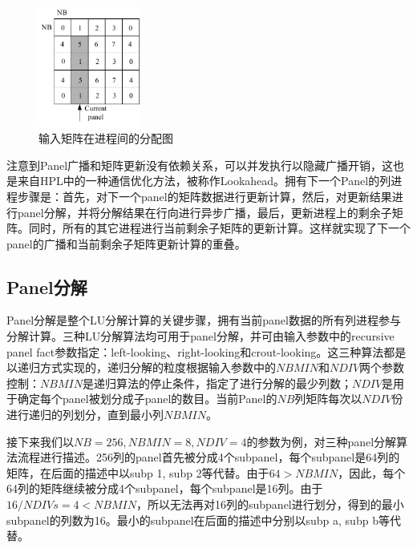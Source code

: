     \begin{figure}
        \centering
        \includegraphics[width=0.3\textwidth]{image/chap02/LUP}
        \caption{输入矩阵在进程间的分配图}
        \label{输入矩阵在进程间的分配图}
    \end{figure}

    注意到Panel广播和矩阵更新没有依赖关系，可以并发执行以隐藏广播开销，这也是来自HPL中的一种通信优化方法，被称作Lookahead。拥有下一个Panel的列进程步骤是：首先，对下一个panel的矩阵数据进行更新计算，然后，对更新结果进行panel分解，并将分解结果在行向进行异步广播，最后，更新进程上的剩余子矩阵。同时，所有的其它进程进行当前剩余子矩阵的更新计算。这样就实现了下一个panel的广播和当前剩余子矩阵更新计算的重叠。

    \subsection{Panel分解}

    Panel分解是整个LU分解计算的关键步骤\cite{2013Correcting}，拥有当前panel数据的所有列进程参与分解计算。三种LU分解算法均可用于panel分解，并可由输入参数中的recursive panel fact参数指定：left-looking、right-looking和crout-looking。这三种算法都是以递归方式实现的，递归分解的粒度根据输入参数中的$\mathit{NBMIN}$和$\mathit{NDIV}$两个参数控制：$\mathit{NBMIN}$是递归算法的停止条件，指定了进行分解的最少列数；$\mathit{NDIV}$是用于确定每个panel被划分成子panel的数目。当前Panel的$\mathit{NB}$列矩阵每次以$\mathit{NDIV}$份进行递归的列划分，直到最小列$\mathit{NBMIN}$。

    接下来我们以$\mathit{NB}=256,\mathit{NBMIN}=8,\mathit{NDIV}=4$的参数为例，对三种panel分解算法流程进行描述。256列的panel首先被分成4个subpanel，每个subpanel是64列的矩阵，在后面的描述中以subp 1, subp 2等代替。由于$64>\mathit{NBMIN}$，因此，每个64列的矩阵继续被分成4个subpanel，每个subpanel是16列。由于$16/\mathit{NDIVs}=4<\mathit{NBMIN}$，所以无法再对16列的subpanel进行划分，得到的最小subpanel的列数为16。最小的subpanel在后面的描述中分别以subp a, subp b等代替。


